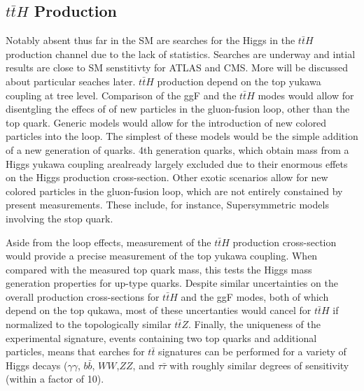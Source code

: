 \subsection{$t\bar{t}H$ Production}

Notably absent thus far in the SM are searches for the Higgs in the $t\bar{t}H$
production channel due to the lack of statistics. Searches are underway and
intial results are close to SM senstitivty for ATLAS and CMS. More will be
discussed about particular seaches later. $t\bar{t}H$ production depend on the
top yukawa coupling at tree level. Comparison of the ggF and the $t\bar{t}H$
modes would allow for disentgling the effecs of of new particles in the
gluon-fusion loop, other than the top quark. Generic models would allow for the
introduction of new colored particles into the loop. The simplest of these
models would be the simple addition of a new generation of quarks. 4th
generation quarks, which obtain mass from a Higgs yukawa coupling arealready
largely excluded due to their enormous effets on the Higgs production
cross-section. Other exotic scenarios allow for new colored particles in the
gluon-fusion loop, which are not entirely constained by present measurements.
These include, for instance, Supersymmetric models involving the stop quark.  


Aside from the loop effects, measurement of the $t\bar{t}H$ production
cross-section would provide a precise measurement of the top yukawa coupling.
When compared with the measured top quark mass, this tests the Higgs mass
generation properties for up-type quarks. Despite similar uncertainties on
the overall production cross-sections for $t\bar{t}H$ and the ggF modes, both
of which depend on the top qukawa, most of these uncertanties would cancel for
$t\bar{t}H$ if normalized to the topologically similar $t\bar{t}Z$. Finally, the uniqueness
of the experimental signature, events containing two top quarks and additional particles, means that
earches for $t\bar{t}$ signatures can be performed for a variety of Higgs decays ($\gamma\gamma$, $b\bar{b}$,
$WW$,$ZZ$, and $\tau\bar{\tau}$ with roughly similar degrees of sensitivity (within a factor of 10). 



